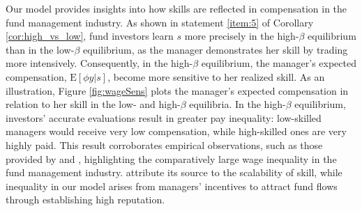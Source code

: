 Our model provides insights into how skills are reflected in compensation in the fund management industry. As shown in statement \ref{item:5} of Corollary \ref{cor:high_vs_low}, fund investors learn $s$ more precisely in the high-$\beta$ equilibrium than in the low-$\beta$ equilibrium, as the manager demonstrates her skill by trading more intensively. Consequently, in the high-$\beta$ equilibrium, the manager's expected compensation, $\mathrm{E}[\phi y|s]$, become more sensitive to her realized skill. As an illustration, Figure \ref{fig:wageSens} plots the manager's expected compensation in relation to her skill in the low- and high-$\beta$ equilibria. In the high-$\beta$ equilibrium, investors' accurate evaluations result in greater pay inequality: low-skilled managers would receive very low compensation, while high-skilled ones are very highly paid. This result corroborates empirical observations, such as those provided by \citet{philippon2012wages} and \citet*{bohm2018since}, highlighting the comparatively large wage inequality in the fund management industry. \citet{celerier2019returns} attribute its source to the scalability of skill, while inequality in our model arises from managers' incentives to attract fund flows through establishing high reputation. %



